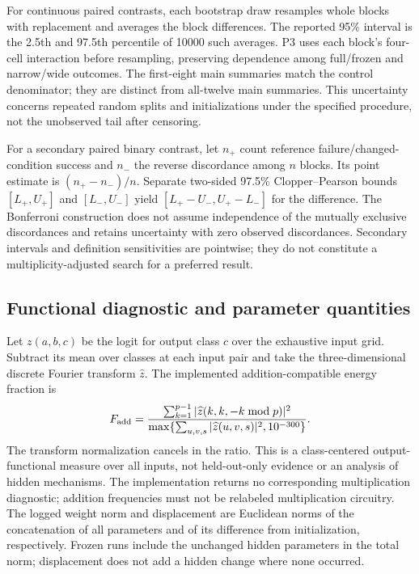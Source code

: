 For continuous paired contrasts, each bootstrap draw resamples whole blocks with replacement and averages the block differences. The reported 95\% interval is the 2.5th and 97.5th percentile of 10000 such averages. P3 uses each block's four-cell interaction before resampling, preserving dependence among full/frozen and narrow/wide outcomes. The first-eight main summaries match the control denominator; they are distinct from all-twelve main summaries. This uncertainty concerns repeated random splits and initializations under the specified procedure, not the unobserved tail after censoring.

For a secondary paired binary contrast, let $n_+$ count reference failure/changed-condition success and $n_-$ the reverse discordance among $n$ blocks. Its point estimate is $(n_+-n_-)/n$. Separate two-sided 97.5\% Clopper--Pearson bounds $[L_+,U_+]$ and $[L_-,U_-]$ yield $[L_+-U_-,U_+-L_-]$ for the difference. The Bonferroni construction does not assume independence of the mutually exclusive discordances and retains uncertainty with zero observed discordances. Secondary intervals and definition sensitivities are pointwise; they do not constitute a multiplicity-adjusted search for a preferred result.

\subsection{Functional diagnostic and parameter quantities}
\label{app:diagnostics}
Let $z(a,b,c)$ be the logit for output class $c$ over the exhaustive input grid. Subtract its mean over classes at each input pair and take the three-dimensional discrete Fourier transform $\widehat z$. The implemented addition-compatible energy fraction is
\begin{equation}
F_{\rm add}=\frac{\sum_{k=1}^{p-1}|\widehat z(k,k,-k\bmod p)|^2}
{\max\{\sum_{u,v,s}|\widehat z(u,v,s)|^2,10^{-300}\}}.
\end{equation}
The transform normalization cancels in the ratio. This is a class-centered output-functional measure over all inputs, not held-out-only evidence or an analysis of hidden mechanisms. The implementation returns no corresponding multiplication diagnostic; addition frequencies must not be relabeled multiplication circuitry. The logged weight norm and displacement are Euclidean norms of the concatenation of all parameters and of its difference from initialization, respectively. Frozen runs include the unchanged hidden parameters in the total norm; displacement does not add a hidden change where none occurred.

